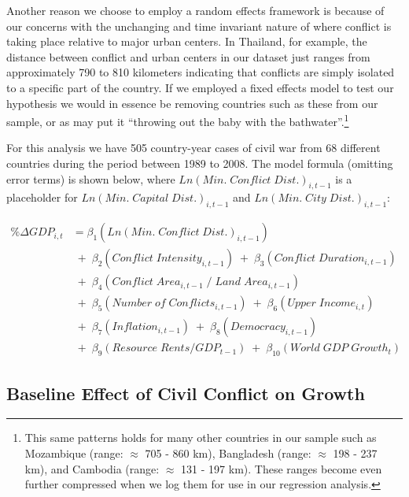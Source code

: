 Another reason we choose to employ a random effects framework is because of our concerns with the unchanging and time invariant nature of where conflict is taking place relative to major urban centers. In Thailand, for example, the distance between conflict and urban centers in our dataset just ranges from approximately 790 to 810 kilometers indicating that conflicts are simply isolated to a specific part of the country. If we employed a fixed effects model to test our hypothesis we would in essence be removing countries such as these from our sample, or as \citet{beck:katz:2001} may put it ``throwing out the baby with the bathwater''.\footnote{This same patterns holds for many other countries in our sample such as Mozambique (range: $\approx$ 705 - 860 km), Bangladesh (range: $\approx$ 198 - 237 km), and Cambodia (range: $\approx$ 131 - 197 km). These ranges become even further compressed when we log them for use in our regression analysis.}

For this analysis we have 505 country-year cases of civil war from 68 different countries during the period between 1989 to 2008. The model formula (omitting error terms) is shown below, where $Ln(Min. \; Conflict \; Dist.)_{i,t-1}$ is a placeholder for $Ln(Min. \; Capital \; Dist.)_{i,t-1}$ and $Ln(Min. \; City \; Dist.)_{i,t-1}$:

\begin{align*}
	\% \Delta GDP_{i,t} &= \beta_{1}(Ln(Min. \; Conflict \; Dist.)_{i,t-1}) \\
	& \;+\; \beta_{2}(Conflict \; Intensity_{i,t-1}) \;+\; \beta_{3}(Conflict \; Duration_{i,t-1}) \\
	& \;+\; \beta_{4}(Conflict \; Area_{i,t-1} \;/\; Land \; Area_{i,t-1}) \\
	& \;+\; \beta_{5}(Number \; of \; Conflicts_{i,t-1}) \;+\; \beta_{6}(Upper \; Income_{i,t}) \\	
	& \;+\; \beta_{7}(Inflation_{i,t-1}) \;+\; \beta_{8}(Democracy_{i,t-1}) \\
	& \;+\; \beta_{9}(Resource \; Rents/GDP_{t-1}) \;+\; \beta_{10}(World \; GDP \; Growth_{t})
\end{align*}

\subsection{Baseline Effect of Civil Conflict on Growth}

